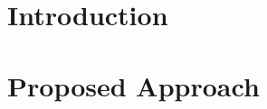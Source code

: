 \documentclass[letterpaper]{article}%
\title{}
\author{Ross B. Alexander \\ Department of Aeronautics and Astronautics \\ Stanford University \\ Stanford, CA 94305 \\ rbalexan@stanford.edu}
\begin{document}
\maketitle

\section{Introduction}

\section{Proposed Approach}








\end{document}
